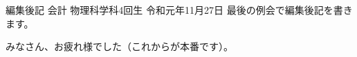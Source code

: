 \documentclass[10pt,b5paper,papersize,dvipdfmx]{jsbook}
\begin{document}
\begin{preface}{編集後記}
        {会計}%
        {物理科学科4回生}%
        {}%
        {令和元年11月27日}%
  最後の例会で編集後記を書きます。\par
  みなさん、お疲れ様でした（これからが本番です）。
\end{preface}
\end{document}
